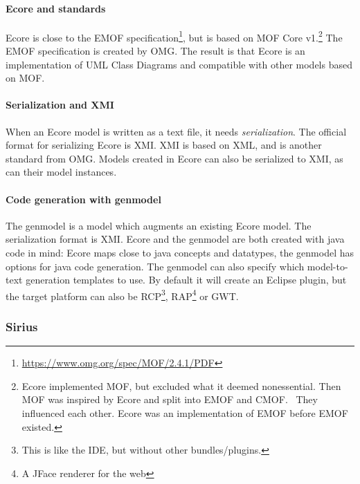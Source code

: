 \paragraph*{Ecore and standards}
\Gls{Ecore} is close to the \acrfull{EMOF} specification\footnote{\href{https://www.omg.org/spec/MOF/2.4.1/PDF}{https://www.omg.org/spec/MOF/2.4.1/PDF}}, but is based on MOF Core v1.\footnote{Ecore implemented MOF, but excluded what it deemed nonessential.
Then MOF was inspired by Ecore and split into \acrshort{EMOF} and CMOF.~\cite{merksMerksMeanderingsEMF2007} They influenced each other. 
Ecore was an implementation of \acrshort{EMOF} before \acrshort{EMOF} existed.}
The \acrshort{EMOF} specification is created by \acrfull{OMG}.
The result is that \gls{Ecore} is an implementation of \gls{UML} Class Diagrams and compatible with other models based on MOF.

\paragraph*{Serialization and XMI} When an \gls{Ecore} model is written as a text file, it needs \textit{serialization}.
The official format for serializing Ecore is \acrfull{XMI}.
\Acrshort{XMI} is based on XML, and is another standard from \acrshort{OMG}.
Models created in \gls{Ecore} can also be serialized to \acrshort{XMI}, as can their model instances.

\paragraph*{Code generation with genmodel}
The genmodel is a model which augments an existing \gls{Ecore} model.
The serialization format is \acrshort{XMI}.
Ecore and the genmodel are both created with java code in mind: Ecore maps close to java concepts and datatypes, the genmodel has options for java code generation.
The genmodel can also specify which model-to-text generation templates to use.
By default it will create an \gls{Eclipse} plugin, but the target platform can also be \acrfull{RCP}\footnote{This is like the \acrshort{IDE}, but without other bundles/plugins.}, \acrfull{RAP}\footnote{A JFace renderer for the web} or \acrfull{GWT}.


\subsubsection{Sirius}\label{sec:sirius}
